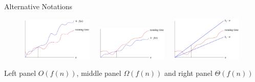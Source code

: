 \begin{vbframe}{Alternative Notations}
\vspace*{-.4cm}
\begin{center}
\begin{figure}
  \includegraphics[width=0.3\textwidth]{figure_man/bigo.png}~~
  \includegraphics[width = 0.3\textwidth]{figure_man/bigomega.png}~~
  \includegraphics[width = 0.3\textwidth]{figure_man/bigtheta.png} \\
\end{figure}
\end{center}

Left panel $O(f(n))$, middle panel $\Omega(f(n))$ and right panel $\Theta(f(n))$


\end{vbframe}

